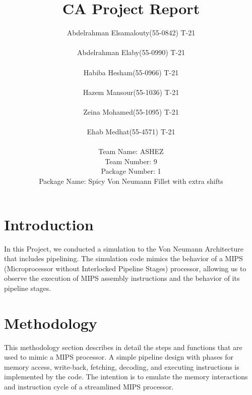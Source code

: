 \documentclass{article}
\title{CA Project Report}
\author{
    Abdelrahman Elsamalouty(55-0842) T-21\\
    \\
    Abdelrahman Elaby(55-0990) T-21 \\
    \\
    Habiba Hesham(55-0966) T-21\\
    \\
    Hazem Mansour(55-1036) T-21\\
    \\
    Zeina Mohamed(55-1095) T-21 \\
    \\
    Ehab Medhat(55-4571) T-21\\
    \\
    Team Name: ASHEZ\\
    Team Number: 9\\
    Package Number: 1\\
    Package Name: Spicy Von Neumann Fillet with extra shifts 
    \date{}
}
\begin{document}
\maketitle
\newpage

\section{Introduction}


In this Project, we conducted a simulation to the Von Neumann Architecture that includes pipelining. The simulation code mimics the behavior of a MIPS (Microprocessor without Interlocked Pipeline Stages) processor, allowing us to observe the execution of MIPS assembly instructions and the behavior of its pipeline stages.

\section{Methodology}

This methodology section describes in detail the steps and functions that are used to mimic a MIPS processor. A simple pipeline design with phases for memory access, write-back, fetching, decoding, and executing instructions is implemented by the code. The intention is to emulate the memory interactions and instruction cycle of a streamlined MIPS processor.
\end{document}
